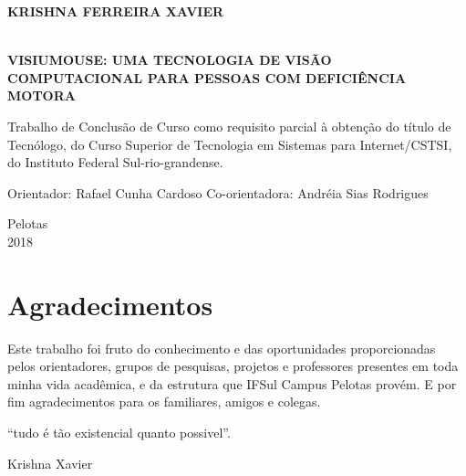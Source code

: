 \begin{titlepage}
\vfill
\begin{center}

    \begin{large} \bfseries KRISHNA FERREIRA XAVIER\end{large}\\[0.4in]
    \vspace{2cm}
    {\large\bfseries{VISIUMOUSE: UMA TECNOLOGIA DE VISÃO COMPUTACIONAL PARA PESSOAS COM DEFICIÊNCIA MOTORA}\\}
    \vspace{1cm}
    \hspace{.45\linewidth}
    \begin{minipage}{.50\linewidth}

Trabalho de Conclusão de Curso como requisito parcial  à obtenção do título de Tecnólogo, do Curso Superior de Tecnologia em Sistemas para Internet/CSTSI, do Instituto Federal Sul-rio-grandense.            

            \vspace{0.5 cm}

            Orientador: Rafael Cunha Cardoso
            Co-orientadora: Andréia Sias Rodrigues
    
    \end{minipage}

    \vspace{2cm}
    \vfill
    {\large Pelotas\\ 2018}
\end{center}

\end{titlepage}

\chapter*{Agradecimentos}
\vspace*{5cm}
Este trabalho foi fruto do conhecimento e das oportunidades proporcionadas pelos orientadores, grupos de pesquisas, projetos e professores presentes em toda minha vida acadêmica, e da estrutura que IFSul Campus Pelotas provém. E por fim agradecimentos para os familiares, amigos e colegas.\\


%
\begin{flushright}
\begin{minipage}[r]{10cm}
\vspace{18cm}
``tudo é tão existencial quanto possivel''.
\begin{flushright}
Krishna Xavier
\end{flushright}
\end{minipage}
\end{flushright}